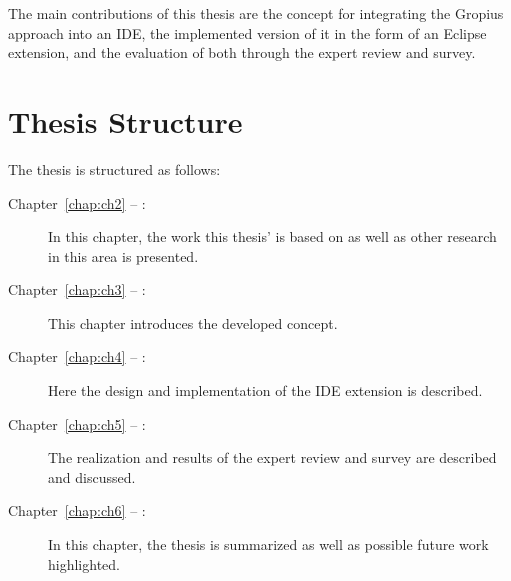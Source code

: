 The main contributions of this thesis are the concept for integrating the \gls{Gropius} approach into an \gls{IDE},
the implemented version of it in the form of an \gls{Eclipse} extension, and the evaluation of both through the expert review and survey.

\section*{Thesis Structure}
The thesis is structured as follows:
\begin{description}
	\item[Chapter~\ref{chap:ch2} -- :] In this chapter, the work this thesis' is based on as well as other research in this area is presented.
	\item[Chapter~\ref{chap:ch3} -- :] This chapter introduces the developed concept.
	\item[Chapter~\ref{chap:ch4} -- :] Here the design and implementation of the \gls{IDE} extension is described.
	\item[Chapter~\ref{chap:ch5} -- :] The realization and results of the expert review and survey are described and discussed.
	\item[Chapter~\ref{chap:ch6} -- :] In this chapter, the thesis is summarized as well as possible future work highlighted.
\end{description}